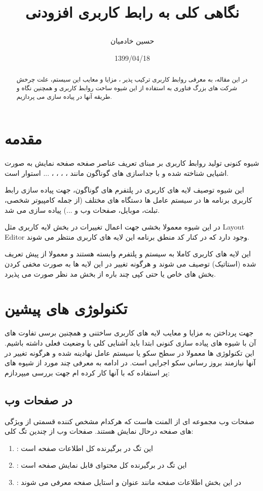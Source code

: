 \documentclass{CSICC2020}
\title{
\lr{Overview on Composable UI}

نگاهی کلی به رابط کاربری افزودنی
}
\date{1399/04/18}
\author[1]{حسین خادمیان}
\affil[1]{
دانشجوی کارشناسی، مهندسی کامپیوتر، دانشگاه شیراز ، شیراز،
me@hkhademian.ir
}
\begin{document}
\maketitle
\begin{abstract}
در این مقاله، به معرفی روابط کاربری ترکیب پذیر ، مزایا و معایب این سیستم، علت چرخش شرکت های بزرگ فناوری به استفاده از این شیوه ساخت روابط کاربری و همچنین نگاه و طریقه آنها در پیاده سازی می پردازیم.
\end{abstract}
\begin{keywords}
\end{keywords}

\section{مقدمه}
شیوه کنونی تولید روابط کاربری بر مبنای تعریف عناصر صفحه صفحه نمایش به صورت اشیایی شناخته شده و با جداسازی  های گوناگون مانند ، ، ، ، ... استوار است.

این شیوه توصیف لایه های کاربری در پلتفرم های گوناگون، جهت پیاده سازی رابط کاربری برنامه ها در سیستم عامل ها دستگاه های مختلف (از جمله کامپیوتر شخصی، تبلت، موبایل، صفحات وب و ...) پیاده سازی می شد.

در این شیوه معمولا بخشی جهت اعمال تغییرات در بخش لایه کاربری مثل Layout Editor وجود دارد که در کنار کد منطق برنامه این لایه های کاربری منتظر می شوند.

این لایه های کاربری کاملا به سیستم و پلتفرم وابسته هستند و معمولا از پیش تعریف شده (استاتیک) توصیف می شوند و هرگونه تغییر در این لایه ها به صورت مخفی کردن بخش های خاص یا حتی کپی چند باره از بخش مد نظر صورت می پذیرد.

\section{تکنولوژی های پیشین}
\label{History}
جهت پرداختن به مزایا و معایب لایه های کاربری ساختنی و همچنین برسی تفاوت های آن با شیوه های پیاده سازی کنونی ابتدا باید آشنایی کلی با وضعیت فعلی داشته باشیم.
این تکنولوژی ها معمولا در سطح سکو یا سیستم عامل نهادینه شده و هرگونه تغییر در آنها نیازمند بروز رسانی سکو اجرایی است.
در ادامه به معرفی چند مورد از شیوه های پر استفاده که با آنها کار کرده ام جهت بررسی میپردازم:

\subsection{ در صفحات وب}
\label{HTML}
صفحات وب مجموعه ای از المنت هاست \cite{html4spec} که هرکدام مشخص کننده قسمتی از ویژگی های صفحه درحال نمایش هستند. صفحات وب از چندین تگ کلی:
\begin{enumerate} 
\item {}: این تگ در برگیرنده کل اطلاعات صفحه است
\item {}: این تگ در برگیرنده کل محتوای قابل نمایش صفحه است
\item {}: در این بخش اطلاعات صفحه مانند عنوان و استایل صفحه معرفی می شوند
\end{enumerate} 
\end{document}

